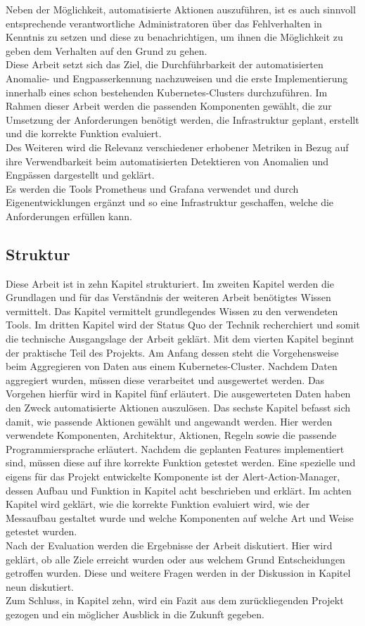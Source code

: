 \documentclass[a4paper,10pt]{scrartcl}
\begin{document}
Neben der Möglichkeit, automatisierte Aktionen auszuführen, ist es auch sinnvoll entsprechende verantwortliche Administratoren über das Fehlverhalten in Kenntnis zu setzen und diese zu benachrichtigen, um ihnen die Möglichkeit zu geben dem Verhalten auf den Grund zu gehen.\\
Diese Arbeit setzt sich das Ziel, die Durchführbarkeit der automatisierten Anomalie- und Engpasserkennung nachzuweisen und die erste Implementierung innerhalb eines schon bestehenden Kubernetes-Clusters durchzuführen. 
Im Rahmen dieser Arbeit werden die passenden Komponenten gewählt, die zur Umsetzung der Anforderungen benötigt werden, die Infrastruktur geplant, erstellt und die korrekte Funktion evaluiert.\\
Des Weiteren wird die Relevanz verschiedener erhobener Metriken in Bezug auf ihre Verwendbarkeit beim automatisierten Detektieren von Anomalien und Engpässen dargestellt und geklärt.\\
Es werden die Tools Prometheus und Grafana verwendet und durch Eigenentwicklungen ergänzt und so eine Infrastruktur geschaffen, welche die Anforderungen erfüllen kann.

\subsection{Struktur}

Diese Arbeit ist in zehn Kapitel strukturiert. Im zweiten Kapitel werden die Grundlagen und für das Verständnis der weiteren Arbeit benötigtes Wissen vermittelt. Das Kapitel vermittelt grundlegendes Wissen zu den verwendeten Tools. Im dritten Kapitel wird der Status Quo der Technik recherchiert und somit die technische Ausgangslage der Arbeit geklärt. Mit dem vierten Kapitel beginnt der praktische Teil des Projekts. Am Anfang dessen steht die Vorgehensweise beim Aggregieren von Daten aus einem Kubernetes-Cluster. Nachdem Daten aggregiert wurden, müssen diese verarbeitet und ausgewertet werden. Das Vorgehen hierfür wird in Kapitel fünf erläutert. Die ausgewerteten Daten haben den Zweck automatisierte Aktionen auszulösen. Das sechste Kapitel befasst sich damit, wie passende Aktionen gewählt und angewandt werden.
Hier werden verwendete Komponenten, Architektur, Aktionen, Regeln sowie die passende Programmiersprache erläutert. Nachdem die geplanten Features implementiert sind, müssen diese auf ihre korrekte Funktion getestet werden.
Eine spezielle und eigens für das Projekt entwickelte Komponente ist der \glqq Alert-Action-Manager\grqq, dessen Aufbau und Funktion in Kapitel acht beschrieben und erklärt.
Im achten Kapitel wird geklärt, wie die korrekte Funktion evaluiert wird, wie der Messaufbau gestaltet wurde und welche Komponenten auf welche Art und Weise getestet wurden.\\
Nach der Evaluation werden die Ergebnisse der Arbeit diskutiert. Hier wird geklärt, ob alle Ziele erreicht wurden oder aus welchem Grund Entscheidungen getroffen wurden. Diese und weitere Fragen werden in der Diskussion in Kapitel neun diskutiert.\\
Zum Schluss, in Kapitel zehn, wird ein Fazit aus dem zurückliegenden Projekt gezogen und ein möglicher Ausblick in die Zukunft gegeben.
\end{document}

